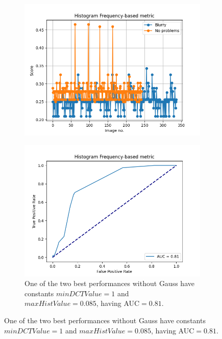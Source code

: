 \begin{figure}[H]
    \centering
    \begin{subfigure}[t]{0.48\textwidth}
        \includegraphics[width=\textwidth]{Figures/BlurredImages/tweakHF/min1_max0.085_output_basic_no_gauss.png}
        \caption{}
        \label{fig:HF_basic_85}
    \end{subfigure}\hspace{1em}
    \begin{subfigure}[t]{0.48\textwidth}
        \includegraphics[width=\textwidth]{Figures/BlurredImages/tweakHF/min1_max0.085_output_roc_no_gauss.png}
        \caption{One of the two best performances without Gauss have constants $minDCTValue=1$ and $maxHistValue=0.085$, having AUC$=0.81$.}

\end{subfigure}
\end{figure}
